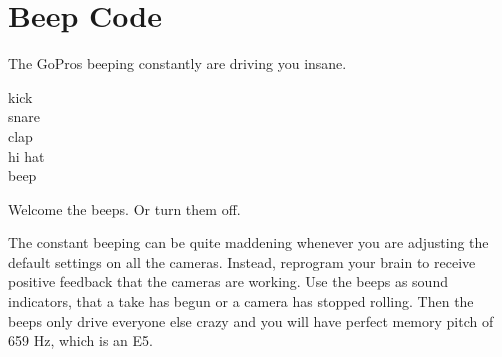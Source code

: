 \chapter{Beep Code}
\pagecolor{white}
\label{chap:17}
\begin{fullwidth}

\problem

{\large The GoPros beeping constantly are driving you insane. \par}

kick
\\
snare
\\
clap
\\
hi hat
\\
beep



\solution

{\large Welcome the beeps. Or turn them off. \par}

The constant beeping can be quite maddening whenever you are adjusting the default settings on all the cameras. Instead, reprogram your brain to receive positive feedback that the cameras are working. Use the beeps as sound indicators, that a take has begun or a camera has stopped rolling. Then the beeps only drive everyone else crazy and you will have perfect memory pitch of 659 Hz, which is an E5.






\clearpage
\end{fullwidth}
